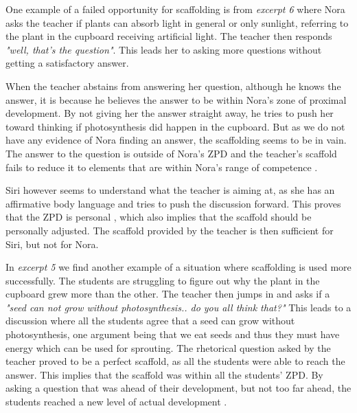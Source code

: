 One example of a failed opportunity for scaffolding is from \emph{excerpt 6} where Nora asks the teacher if plants can absorb light in general or only sunlight, referring to the plant in the cupboard receiving artificial light. The teacher then responds \emph{"well, that's the question"}. This leads her to asking more questions without getting a satisfactory answer. 

When the teacher abstains from answering her question, although he knows the answer, it is because he believes the answer to be within Nora's zone of proximal development. By not giving her the answer straight away, he tries to push her toward thinking if photosynthesis did happen in the cupboard. But as we do not have any evidence of Nora finding an answer, the scaffolding seems to be in vain. The answer to the question is outside of Nora's ZPD and the teacher's scaffold fails to reduce it to elements that are within Nora's range of competence \citep{wood1976role}. 

Siri however seems to understand what the teacher is aiming at, as she has an affirmative body language and tries to push the discussion forward. This proves that the ZPD is personal \citep{vygotskiui1978mind}, which also implies that the scaffold should be personally adjusted. The scaffold provided by the teacher is then sufficient for Siri, but not for Nora. 

In \emph{excerpt 5} we find another example of a situation where scaffolding is used more successfully. The students are struggling to figure out why the plant in the cupboard grew more than the other. The teacher then jumps in and asks if a \emph{"seed can not grow without photosynthesis.. do you all think that?"} This leads to a discussion where all the students agree that a seed can grow without photosynthesis, one argument being that we eat seeds and thus they must have energy which can be used for sprouting. The rhetorical question asked by the teacher proved to be a perfect scaffold, as all the students were able to reach the answer. This implies that the scaffold was within all the students' ZPD. By asking a question that was ahead of their development, but not too far ahead, the students reached a new level of actual development  \citep{vygotskiui1978mind}.

